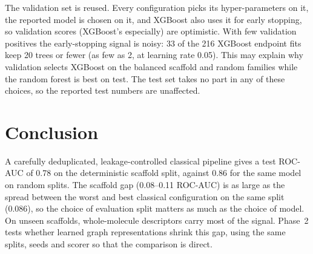 \documentclass[conference]{IEEEtran}
\begin{document}
The validation set is reused. Every configuration picks its hyper-parameters on it, the reported model is chosen on it, and XGBoost also uses it for early stopping, so validation scores (XGBoost's especially) are optimistic. With few validation positives the early-stopping signal is noisy: 33 of the 216 XGBoost endpoint fits keep 20 trees or fewer (as few as 2, at learning rate 0.05). This may explain why validation selects XGBoost on the balanced scaffold and random families while the random forest is best on test. The test set takes no part in any of these choices, so the reported test numbers are unaffected.

\section{Conclusion}
A carefully deduplicated, leakage-controlled classical pipeline gives a test ROC-AUC of 0.78 on the deterministic scaffold split, against 0.86 for the same model on random splits. The scaffold gap (0.08--0.11 ROC-AUC) is as large as the spread between the worst and best classical configuration on the same split (0.086), so the choice of evaluation split matters as much as the choice of model. On unseen scaffolds, whole-molecule descriptors carry most of the signal. Phase~2 tests whether learned graph representations shrink this gap, using the same splits, seeds and scorer so that the comparison is direct.



\end{document}
